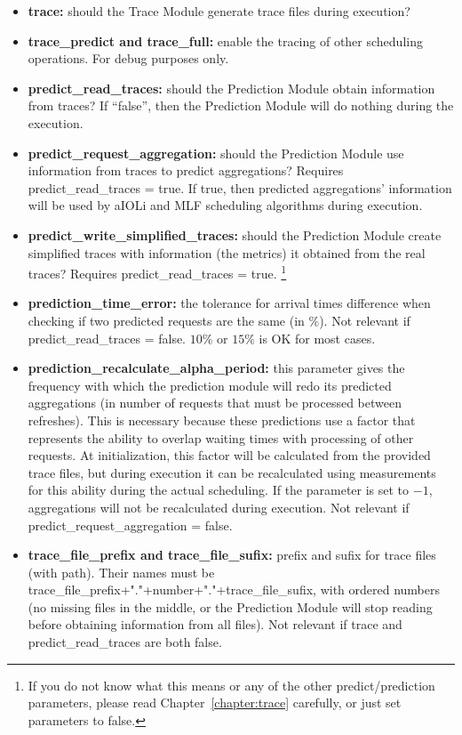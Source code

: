 \begin{itemize}
\item \textbf{trace:} should the Trace Module generate trace files during execution?
\item \textbf{trace\_predict and trace\_full:} enable the tracing of other scheduling operations. For debug purposes only.
\item \textbf{predict\_read\_traces:} should the Prediction Module obtain information from traces? If ``false'', then the Prediction Module will do nothing during the execution.
\item \textbf{predict\_request\_aggregation:} should the Prediction Module use information from traces to predict aggregations? Requires predict\_read\_traces = true. If true, then predicted aggregations' information will be used by aIOLi and MLF scheduling algorithms during execution.
\item \textbf{predict\_write\_simplified\_traces:} should the Prediction Module create simplified traces with information (the metrics) it obtained from the real traces? Requires predict\_read\_traces = true. \footnote{If you do not know what this means or any of the other predict/prediction parameters, please read Chapter~\ref{chapter:trace} carefully, or just set parameters to false.}
\item \textbf{prediction\_time\_error:} the tolerance for arrival times difference when checking if two predicted requests are the same (in $\%$). Not relevant if predict\_read\_traces = false. $10\%$ or $15\%$ is OK for most cases.
\item \textbf{prediction\_recalculate\_alpha\_period:} this parameter gives the frequency with which the prediction module will redo its predicted aggregations  (in number of requests that must be processed between refreshes). This is necessary because these predictions use a factor that represents the ability to overlap waiting times with processing of other requests. At initialization, this factor will be calculated from the provided trace files, but during execution it can be recalculated using measurements for this ability during the actual scheduling. If the parameter is set to $-1$, aggregations will not be recalculated during execution. Not relevant if predict\_request\_aggregation = false.
\item \textbf{trace\_file\_prefix and trace\_file\_sufix:} prefix and sufix for trace files (with path). Their names must be trace\_file\_prefix+"."+number+"."+trace\_file\_sufix, with ordered numbers (no missing files in the middle, or the Prediction Module will stop reading before obtaining information from all files). Not relevant if trace and predict\_read\_traces are both false.

\end{itemize}
